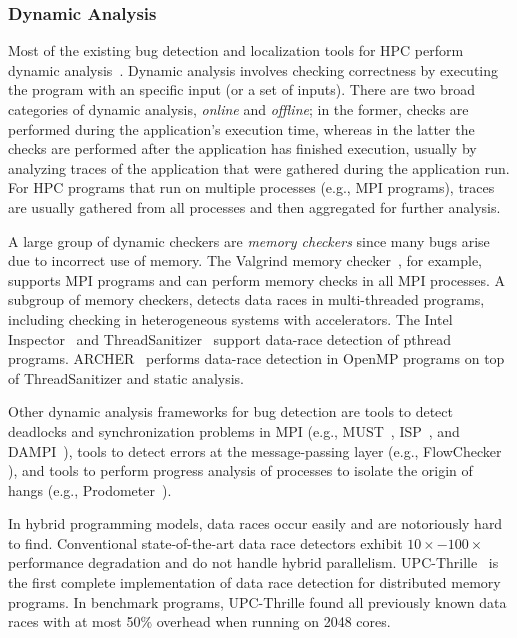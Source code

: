 \subsubsection{Dynamic Analysis}
Most of the existing bug detection and localization tools for HPC perform
dynamic analysis~\cite{CACM:Debugging}.
Dynamic analysis involves checking correctness by executing the program with an specific
input (or a set of inputs). There are two broad categories of dynamic analysis, 
\textit{online} and \textit{offline}; in the former, checks are performed during the 
application's execution time, whereas in the latter the checks are performed after
the application has finished execution, usually by analyzing traces of the application
that were gathered during the application run. For HPC programs that run on multiple 
processes (e.g., MPI programs), traces are usually gathered from all processes and
then aggregated for further analysis.

A large group of dynamic checkers are \textit{memory checkers} since many bugs
arise due to incorrect use of memory. The Valgrind memory checker~\cite{Valgrind}, for example,
supports MPI programs and can perform memory checks in all MPI processes. A subgroup
of memory checkers, detects data races in multi-threaded programs, including checking
in heterogeneous systems with accelerators. The Intel Inspector~\cite{IntelInspector} 
and ThreadSanitizer~\cite{ThreadSanitizer} support data-race detection of pthread programs.
ARCHER~\cite{ARCHER} performs data-race detection in OpenMP programs on top of 
ThreadSanitizer and static analysis.

Other dynamic analysis frameworks for bug detection are tools to detect 
deadlocks and synchronization problems in MPI (e.g., MUST~\cite{MUST}, ISP~\cite{ISP}, and DAMPI~\cite{DAMPI}), 
tools to detect errors at the message-passing layer (e.g., FlowChecker \cite{FLOWCHECKER}), and tools to perform progress analysis of processes to isolate the origin of hangs (e.g., Prodometer~\cite{PRODOMETER,PACTLaguna:2012}).

In hybrid programming models, data races occur easily and
are notoriously hard to find.  Conventional state-of-the-art data race
detectors exhibit $10\times-100\times$ performance degradation and do
not handle hybrid parallelism.  UPC-Thrille~\cite{ICS'13,PPoPP'13,SC'11,upc-thrille}
is the first complete
implementation of data race detection for distributed memory
programs. In benchmark programs, UPC-Thrille found all previously known 
data races with at most 50\% overhead when running on 2048
cores.


